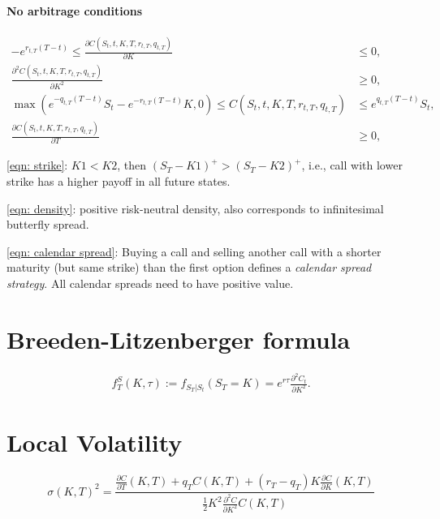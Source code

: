 \documentclass[a4paper, DIV19,12pt]{scrartcl}
\newcommand{\bparens}  [1]{\left(       #1 \right)      } %
\begin{document}
\paragraph{No arbitrage conditions}

\begin{align}
-e^{r_{t,T}\bparens{T-t}}  \leq \frac{\partial C\bparens{S_t, t, K, T, r_{t,T}, q_{t,T}}}{\partial K} & \leq 0, \label{eqn: strike}\\
                                       \frac{\partial^2 C\bparens{S_t, t, K, T, r_{t,T}, q_{t,T}}}{\partial K^2} & \geq 0, \label{eqn: density}\\
\max\bparens{e^{-q_{t,T}\bparens{T-t}}S_t -e^{-r_{t,T}\bparens{T-t}}K, 0}  \leq C\bparens{S_t, t, K, T, r_{t,T}, q_{t,T}} & \leq e^{q_{t,T}\bparens{T-t}}S_t, \label{eqn: calendar spread} \\
                                         \frac{\partial C\bparens{S_t, t, K, T, r_{t,T}, q_{t,T}}}{\partial T} & \geq 0,
\end{align}

\ref{eqn: strike}: $K1 < K2$, then $\bparens{S_T - K1}^+ > \bparens{S_T - K2}^+$, i.e., call with lower strike has a higher payoff in all future states.

\ref{eqn: density}: positive risk-neutral density, also corresponds to infinitesimal butterfly spread.

\ref{eqn: calendar spread}:
Buying a call and selling another call with a shorter maturity (but same strike) than the first option 
defines a \emph{calendar spread strategy}. All calendar spreads need to have positive value.

\section{Breeden-Litzenberger formula}

\begin{eqnarray}
f^S_T\bparens{K, \tau} := f_{S_T | S_t}\bparens{S_T = K} = e^{r \tau}\frac{\partial^2 C_t}{\partial K^2}.
\end{eqnarray}

\section{Local Volatility}

\begin{equation}
\sigma\bparens{K,T}^2 = \frac{\frac{\partial C}{\partial T}\bparens{K,T} + q_T C\bparens{K,T} + \bparens{r_T - q_T} K \frac{\partial C}{\partial K}\bparens{K,T}}{ \frac{1}{2} K^2 \frac{\partial^2 C}{\partial K^2} C\bparens{K,T} }
\end{equation}
\end{document}

